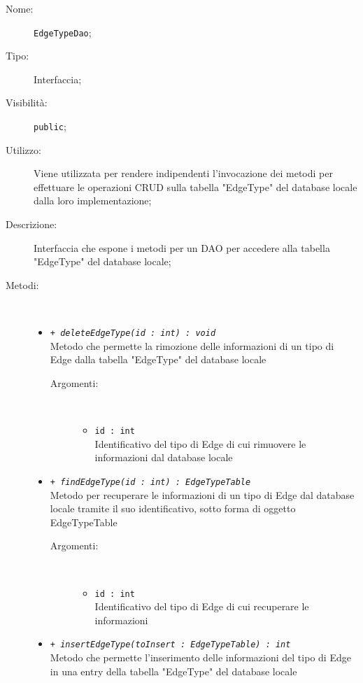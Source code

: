 \documentclass[../DefinizioneDiProdotto.tex]{subfiles}
\begin{document}
\begin{description}
	\item[Nome:] \texttt{EdgeTypeDao};
	\item[Tipo:] Interfaccia;
	\item[Visibilità:] \texttt{public};
	\item[Utilizzo:] Viene utilizzata per rendere indipendenti l'invocazione dei metodi per effettuare le operazioni CRUD sulla tabella "EdgeType" del database locale dalla loro implementazione;
	\item[Descrizione:] Interfaccia che espone i metodi per un DAO per accedere alla tabella "EdgeType" del database locale;
	\item[Metodi:] \
	\begin{itemize}
		\item \texttt{+ \textit{deleteEdgeType(id : int) : void}}\\
		Metodo che permette la rimozione delle informazioni di un tipo di Edge dalla tabella "EdgeType" del database locale
		\begin{description}
			\item[Argomenti:] \
			\begin{itemize}
				\item \texttt{id : int}\\
				Identificativo del tipo di Edge di cui rimuovere le informazioni dal database locale\end{itemize}
		\end{description}
		\item \texttt{+ \textit{findEdgeType(id : int) : EdgeTypeTable}}\\
		Metodo per recuperare le informazioni di un tipo di Edge dal database locale tramite il suo identificativo, sotto forma di oggetto EdgeTypeTable
		\begin{description}
			\item[Argomenti:] \
			\begin{itemize}
				\item \texttt{id : int}\\
				Identificativo del tipo di Edge di cui recuperare le informazioni\end{itemize}
		\end{description}
		\item \texttt{+ \textit{insertEdgeType(toInsert : EdgeTypeTable) : int}}\\
		Metodo che permette l'inserimento delle informazioni del tipo di Edge in una entry della tabella "EdgeType" del database locale

\end{itemize}
\end{description}
\end{document}
